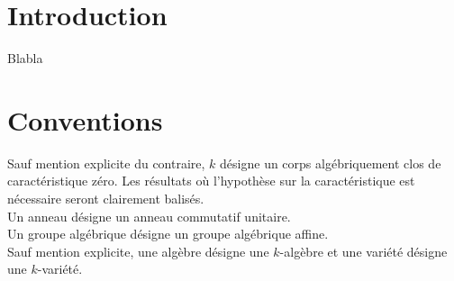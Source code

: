 
\chapter*{Introduction}

Blabla

\chapter*{Conventions}
\label{sec:conventions}

Sauf mention explicite du contraire, $k$ désigne un corps algébriquement clos de caractéristique zéro. Les résultats où l'hypothèse sur la caractéristique est nécessaire seront clairement balisés.\\
Un anneau désigne un anneau commutatif unitaire. \\
Un groupe algébrique désigne un groupe algébrique affine.\\
Sauf mention explicite, une algèbre désigne une $k$-algèbre et une variété désigne une $k$-variété.


